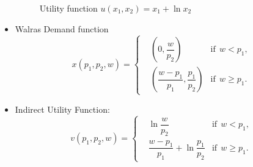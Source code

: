 \documentclass[
12pt, %
a4paper, %
onecolumn, %
portrait %
]{article}
\begin{document}
\begin{itemize}
\begin{figure}[H]
	\centering
	\caption{Utility function $u(x_1,x_2)=x_1+\ln x_2$}
	\label{Fig.lable}
\end{figure}
	
\item Walras Demand function
\begin{equation*}
x(p_1,p_2,w)=\left\{
\begin{aligned}
&\left(0,\dfrac{w}{p_2}\right)&\text{if}\;\,w<p_1,\\
&\left(\dfrac{w-p_1}{p_1},\dfrac{p_1}{p_2}\right)&\text{if}\;\,w\ge p_1.
\end{aligned}
\right.
\end{equation*}

\item Indirect Utility Function:
\begin{equation*}
v(p_1,p_2,w)=\left\{
\begin{aligned}
&\ln\dfrac{w}{p_2}&\text{if}\;\,w<p_1,\\
&\dfrac{w-p_1}{p_1}+\ln\dfrac{p_1}{p_2}&\text{if}\;\,w\ge p_1.
\end{aligned}
\right.
\end{equation*}

\end{itemize}
\end{document}
